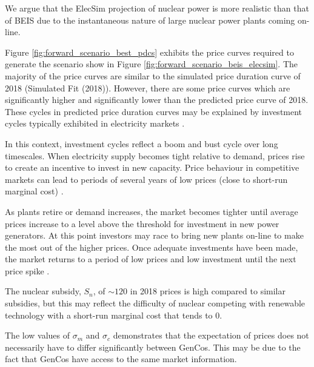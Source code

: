 We argue that the ElecSim projection of nuclear power is more realistic than that of BEIS due to the instantaneous nature of large nuclear power plants coming on-line.

Figure \ref{fig:forward_scenario_best_pdcs} exhibits the price curves required to generate the scenario show in Figure \ref{fig:forward_scenario_beis_elecsim}. The majority of the price curves are similar to the simulated price duration curve of 2018 (Simulated Fit (2018)). However, there are some price curves which are significantly higher and significantly lower than the predicted price curve of 2018. These cycles in predicted price duration curves may be explained by investment cycles typically exhibited in electricity markets \cite{Gross2007}. 

In this context, investment cycles reflect a boom and bust cycle over long timescales. When electricity supply becomes tight relative to demand, prices rise to create an incentive to invest in new capacity. Price behaviour in competitive markets can lead to periods of several years of low prices (close to short-run marginal cost) \cite{white2005concentrated}. 

As plants retire or demand increases, the market becomes tighter until average prices increase to a level above the threshold for investment in new power generators. At this point investors may race to bring new plants on-line to make the most out of the higher prices. Once adequate investments have been made, the market returns to a period of low prices and low investment until the next price spike \cite{Gross2007}. 


The nuclear subsidy, $S_n$, of ${\sim}$\textsterling $120$ in 2018 prices is high compared to similar subsidies, but this may reflect the difficulty of nuclear competing with renewable technology with a short-run marginal cost that tends to \textsterling $0$.

The low values of $\sigma_m$ and $\sigma_c$ demonstrates that the expectation of prices does not necessarily have to differ significantly between GenCos. This may be due to the fact that GenCos have access to the same market information.


